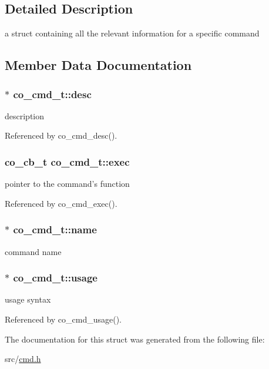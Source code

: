 \subsection{Detailed Description}
a struct containing all the relevant information for a specific command 

\subsection{Member Data Documentation}
\hypertarget{structco__cmd__t_a97bb000840489763d726b1e81181a5f5}{
\subsubsection[{desc}]{$\ast$ co\-\_\-cmd\-\_\-t\-::desc}}\label{structco__cmd__t_a97bb000840489763d726b1e81181a5f5}
description 

Referenced by co\-\_\-cmd\-\_\-desc().

\hypertarget{structco__cmd__t_add04e691f5afa12a19ecc870860d9e82}{
\subsubsection[{exec}]{\setlength{\rightskip}{0pt plus 5cm}co\-\_\-cb\-\_\-t co\-\_\-cmd\-\_\-t\-::exec}}\label{structco__cmd__t_add04e691f5afa12a19ecc870860d9e82}
pointer to the command's function 

Referenced by co\-\_\-cmd\-\_\-exec().

\hypertarget{structco__cmd__t_ab6400b20e7ea4d71d79c421f57b18862}{
\subsubsection[{name}]{$\ast$ co\-\_\-cmd\-\_\-t\-::name}}\label{structco__cmd__t_ab6400b20e7ea4d71d79c421f57b18862}
command name \hypertarget{structco__cmd__t_af73f4d544979225b4f5ef4fe22f855ef}{
\subsubsection[{usage}]{$\ast$ co\-\_\-cmd\-\_\-t\-::usage}}\label{structco__cmd__t_af73f4d544979225b4f5ef4fe22f855ef}
usage syntax 

Referenced by co\-\_\-cmd\-\_\-usage().



The documentation for this struct was generated from the following file\-:\begin{DoxyCompactItemize}
\item 
src/\hyperlink{cmd_8h}{cmd.\-h}\end{DoxyCompactItemize}
